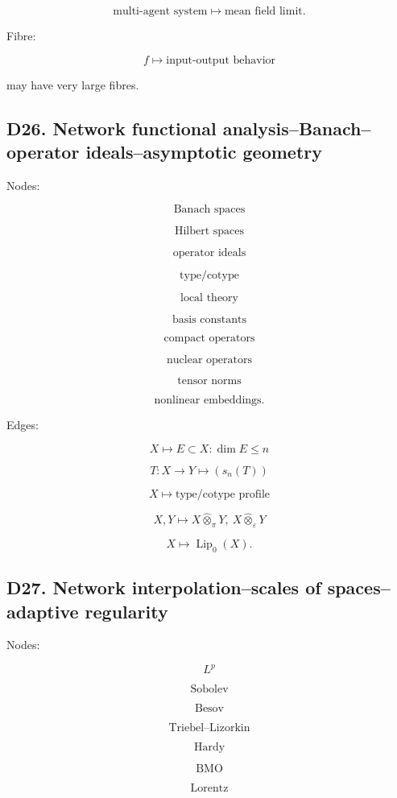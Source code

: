 \documentclass[11pt]{article}
\begin{document}
\[
\text{multi-agent system}\mapsto \text{mean field limit}.
\]

Fibre:

\[
f\mapsto \text{input-output behavior}
\]

may have very large fibres.



\subsection{D26. Network functional analysis--Banach--operator ideals--asymptotic geometry}

Nodes:

\[
\text{Banach spaces}
\]

\[
\text{Hilbert spaces}
\]

\[
\text{operator ideals}
\]

\[
\text{type/cotype}
\]

\[
\text{local theory}
\]

\[
\text{basis constants}
\]

\[
\text{compact operators}
\]

\[
\text{nuclear operators}
\]

\[
\text{tensor norms}
\]

\[
\text{nonlinear embeddings}.
\]

Edges:

\[
X\mapsto {E\subset X:\dim E\le n}
\]

\[
T:X\to Y\mapsto (s_n(T))
\]

\[
X\mapsto \text{type/cotype profile}
\]

\[
X,Y\mapsto X\widehat\otimes_\pi Y,\ X\widehat\otimes_\varepsilon Y
\]

\[
X\mapsto \operatorname{Lip}_0(X).
\]



\subsection{D27. Network interpolation--scales of spaces--adaptive regularity}

Nodes:

\[
L^p
\]

\[
\text{Sobolev}
\]

\[
\text{Besov}
\]

\[
\text{Triebel--Lizorkin}
\]

\[
\text{Hardy}
\]

\[
\text{BMO}
\]

\[
\text{Lorentz}
\]
\end{document}

